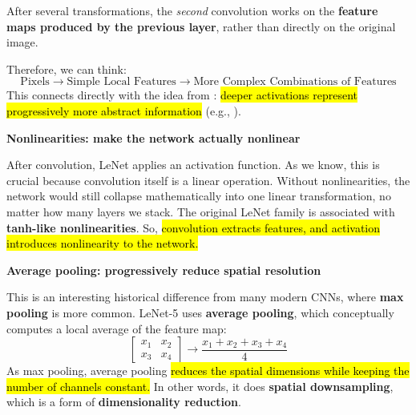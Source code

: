 \highspace
After several transformations, the \emph{second} convolution works on the \textbf{feature maps produced by the previous layer}, rather than directly on the original image.

\highspace
Therefore, we can think:
\begin{equation*}
    \text{Pixels} \to \text{Simple Local Features} \to \text{More Complex Combinations of Features}
\end{equation*}
This connects directly with the idea from : \hl{deeper activations represent progressively more abstract information} (e.g., ).

\highspace
\begin{flushleft}
    \textcolor{Green3}{ \textbf{Nonlinearities: make the network actually nonlinear}}
\end{flushleft}
After convolution, LeNet applies an activation function. As we know, this is crucial because convolution itself is a linear operation. Without nonlinearities, the network would still collapse mathematically into one linear transformation, no matter how many layers we stack. The original LeNet family is associated with \textbf{tanh-like nonlinearities}. So, \hl{convolution extracts features, and activation introduces nonlinearity to the network.}

\highspace
\begin{flushleft}
    \textcolor{Green3}{ \textbf{Average pooling: progressively reduce spatial resolution}}
\end{flushleft}
This is an interesting historical difference from many modern CNNs, where \textbf{max pooling} is more common. LeNet-5 uses \textbf{average pooling}, which conceptually computes a local average of the feature map:
\begin{equation*}
    \begin{bmatrix}
        x_1 & x_2 \\
        x_3 & x_4
    \end{bmatrix}
    \to
    \frac{x_1 + x_2 + x_3 + x_4}{4}
\end{equation*}
As max pooling, average pooling \hl{reduces the spatial dimensions while keeping the number of channels constant.} In other words, it does \textbf{spatial downsampling}, which is a form of \textbf{dimensionality reduction}.

